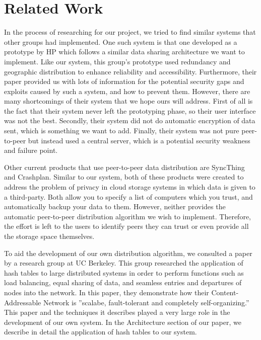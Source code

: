 \section{Related Work}
In the process of researching for our project, we tried to find similar systems that other groups had implemented.  One such system is that one developed as a prototype by HP which follows a similar data sharing architecture we want to implement. \cite{hp} Like our system, this group's prototype used redundancy and geographic distribution to enhance reliability and accessibility.  Furthermore, their paper provided us with lots of information for the potential security gaps and exploits caused by such a system, and how to prevent them.  However, there are many shortcomings of their system that we hope ours will address.  First of all is the fact that their system never left the prototyping phase, so their user interface was not the best.  Secondly, their system did not do automatic encryption of data sent, which is something we want to add.  Finally, their system was not pure peer-to-peer but instead used a central server, which is a potential security weakness and failure point.

Other current products that use peer-to-peer data distribution are SyncThing and Crashplan. \cite{syncthing} \cite{crashplan} Similar to our system, both of these products were created to address the problem of privacy in cloud storage systems in which data is given to a third-party.  Both allow you to specify a list of computers which you trust, and automatically backup your data to them.  However, neither provides the automatic peer-to-peer distribution algorithm we wish to implement.  Therefore, the effort is left to the users to identify peers they can trust or even provide all the storage space themselves.

To aid the development of our own distribution algorithm, we consulted a paper by a research group at UC Berkeley.  \cite{scalable}  This group researched the application of hash tables to large distributed systems in order to perform functions such as load balancing, equal sharing of data, and seamless entries and departures of nodes into the network.  In this paper, they demonstrate how their Content-Addressable Network is ''scalabe, fault-tolerant and completely self-organizing.''  This paper and the techniques it describes played a very large role in the development of our own system.  In the Architecture section of our paper, we describe in detail the application of hash tables to our system.

